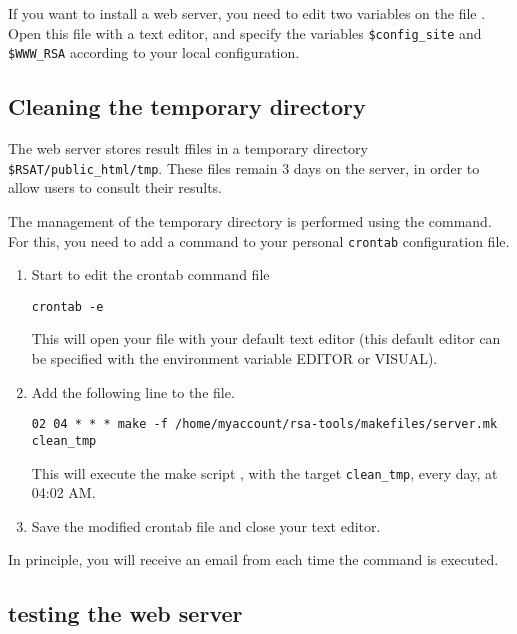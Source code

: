 \documentclass{article}
\begin{document}
If you want to install a web server, you need to edit two variables on
the file . Open this file with a text editor, and
specify the variables \texttt{\$config\_site} and \texttt{\$WWW\_RSA}
according to your local configuration.

\subsection{Cleaning the temporary directory}

The web server stores result ffiles in a temporary directory
\texttt{\$RSAT/public\_html/tmp}. These files remain 3 days on the
server, in order to allow users to consult their results.

The management of the temporary directory is performed using the
 command. For this, you need to add a command to your
personal \texttt{crontab} configuration file. 

\begin{enumerate}
\item Start to edit the crontab command file

\begin{verbatim}
crontab -e
\end{verbatim}

This will open your  file with your default text editor
(this default editor can be specified with the environment variable
EDITOR or VISUAL).

\item Add the following line to the  file. 

\begin{verbatim}
02 04 * * * make -f /home/myaccount/rsa-tools/makefiles/server.mk clean_tmp
\end{verbatim}

This will execute the make script , with the target
\texttt{clean\_tmp}, every day, at 04:02 AM. 

\item Save the modified crontab file and close your text editor.

\end{enumerate}

In principle, you will receive an email from  each
time the command is executed.


\subsection{testing the web server}
\end{document}
